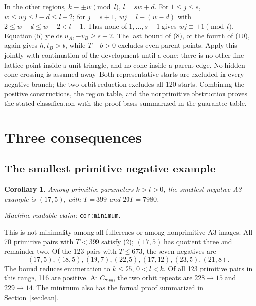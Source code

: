 \documentclass[11pt]{amsart}
\newcommand{\record}[1]{\nolinkurl{#1}}
\newtheorem{corollary}[theorem]{Corollary}
\newcommand{\claimid}[1]{\par\nopagebreak\noindent\textit{Machine-readable claim:} \record{#1}.\par}
\begin{document}
In the other regions, $k\equiv\pm w\pmod l$, $l=sw+d$.
For $1\le j\le s$, $w\le wj\le l-d\le l-2$; for $j=s+1$,
$wj=l+(w-d)$ with $2\le w-d\le w-2<l-1$. Thus none of
$1,\ldots,s+1$ gives $wj\equiv\pm1\pmod l$. Equation (5) yields
$u_A,-v_B\ge s+2$. The last bound of (8), or the fourth of (10),
again gives $h,t_B>b$, while $T-b>0$ excludes even parent points.
Apply this jointly with continuation of the development until a cone:
there is no other fine lattice point inside a unit triangle, and no
cone inside a parent edge. No hidden cone crossing is assumed away.
Both representative starts are excluded in every negative branch;
the two-orbit reduction excludes all 120 starts. Combining the positive
constructions, the region table, and the nonprimitive obstruction
proves the stated classification with the proof basis summarized
in the guarantee table.

\section{Three consequences}\label{sec:corollaries}
\subsection{The smallest primitive negative example}
\begin{corollary}\label{cor:minimum}
Among primitive parameters $k>l>0$, the smallest negative A3 example
is $(17,5)$, with $T=399$ and $20T=7980$.
\end{corollary}
\claimid{cor:minimum}
This is not minimality among all fullerenes or among nonprimitive A3
images. All 70 primitive pairs with $T<399$ satisfy (2); $(17,5)$
has quotient three and remainder two. Of the 123 pairs with $T\le673$,
the seven negatives are
\[
(17,5),(18,5),(19,7),(22,5),(17,12),(23,5),(21,8).
\]
The bound reduces enumeration to $k\le25$, $0<l<k$. Of all 123
primitive pairs in this range, 116 are positive. At $C_{7980}$ the two
orbit repeats are $228\to15$ and $229\to14$. The minimum also has the
formal proof summarized in Section~\ref{sec:lean}.
\end{document}

